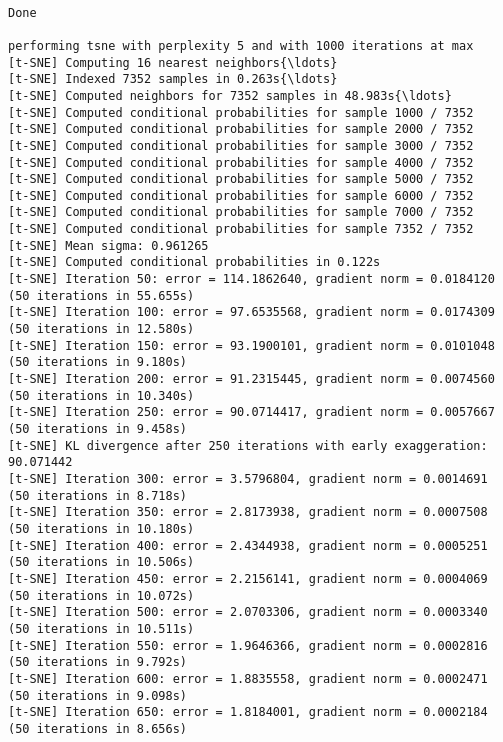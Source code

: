\documentclass[11pt]{article}
\begin{document}
    \begin{center}
    \end{center}
    { \hspace*{\fill} \\}
    
    \begin{Verbatim}[commandchars=\\\{\}]
Done

performing tsne with perplexity 5 and with 1000 iterations at max
[t-SNE] Computing 16 nearest neighbors{\ldots}
[t-SNE] Indexed 7352 samples in 0.263s{\ldots}
[t-SNE] Computed neighbors for 7352 samples in 48.983s{\ldots}
[t-SNE] Computed conditional probabilities for sample 1000 / 7352
[t-SNE] Computed conditional probabilities for sample 2000 / 7352
[t-SNE] Computed conditional probabilities for sample 3000 / 7352
[t-SNE] Computed conditional probabilities for sample 4000 / 7352
[t-SNE] Computed conditional probabilities for sample 5000 / 7352
[t-SNE] Computed conditional probabilities for sample 6000 / 7352
[t-SNE] Computed conditional probabilities for sample 7000 / 7352
[t-SNE] Computed conditional probabilities for sample 7352 / 7352
[t-SNE] Mean sigma: 0.961265
[t-SNE] Computed conditional probabilities in 0.122s
[t-SNE] Iteration 50: error = 114.1862640, gradient norm = 0.0184120 (50 iterations in 55.655s)
[t-SNE] Iteration 100: error = 97.6535568, gradient norm = 0.0174309 (50 iterations in 12.580s)
[t-SNE] Iteration 150: error = 93.1900101, gradient norm = 0.0101048 (50 iterations in 9.180s)
[t-SNE] Iteration 200: error = 91.2315445, gradient norm = 0.0074560 (50 iterations in 10.340s)
[t-SNE] Iteration 250: error = 90.0714417, gradient norm = 0.0057667 (50 iterations in 9.458s)
[t-SNE] KL divergence after 250 iterations with early exaggeration: 90.071442
[t-SNE] Iteration 300: error = 3.5796804, gradient norm = 0.0014691 (50 iterations in 8.718s)
[t-SNE] Iteration 350: error = 2.8173938, gradient norm = 0.0007508 (50 iterations in 10.180s)
[t-SNE] Iteration 400: error = 2.4344938, gradient norm = 0.0005251 (50 iterations in 10.506s)
[t-SNE] Iteration 450: error = 2.2156141, gradient norm = 0.0004069 (50 iterations in 10.072s)
[t-SNE] Iteration 500: error = 2.0703306, gradient norm = 0.0003340 (50 iterations in 10.511s)
[t-SNE] Iteration 550: error = 1.9646366, gradient norm = 0.0002816 (50 iterations in 9.792s)
[t-SNE] Iteration 600: error = 1.8835558, gradient norm = 0.0002471 (50 iterations in 9.098s)
[t-SNE] Iteration 650: error = 1.8184001, gradient norm = 0.0002184 (50 iterations in 8.656s)

\end{Verbatim}
\end{document}
